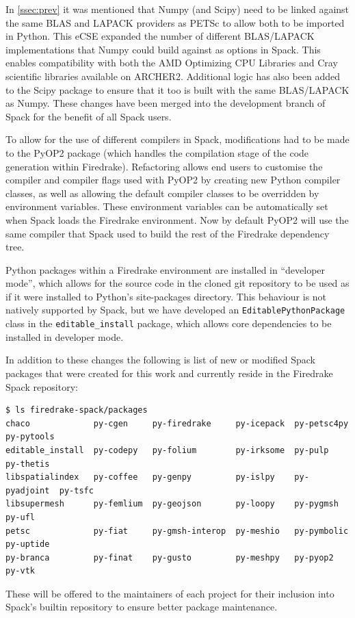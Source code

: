 \documentclass[a4paper,11pt]{article}
\begin{document}
In \cref{ssec:prev} it was mentioned that Numpy (and Scipy) need to be linked against the same BLAS and LAPACK providers as PETSc to allow both to be imported in Python.
This eCSE expanded the number of different BLAS/LAPACK implementations that Numpy could build against as options in Spack.
This enables compatibility with both the AMD Optimizing CPU Libraries and Cray scientific libraries available on ARCHER2.
Additional logic has also been added to the Scipy package to ensure that it too is built with the same BLAS/LAPACK as Numpy.
These changes have been merged into the development branch of Spack for the benefit of all Spack users.

To allow for the use of different compilers in Spack, modifications had to be made to the PyOP2 package (which handles the compilation stage of the code generation within Firedrake).
Refactoring allows end users to customise the compiler and compiler flags used with PyOP2 by creating new Python compiler classes, as well as allowing the default compiler classes to be overridden by environment variables.
These environment variables can be automatically set when Spack loads the Firedrake environment.
Now by default PyOP2 will use the same compiler that Spack used to build the rest of the Firedrake dependency tree.

Python packages within a Firedrake environment are installed in ``developer mode'', which allows for the source code in the cloned git repository to be used as if it were installed to Python's site-packages directory.
This behaviour is not natively supported by Spack, but we have developed an \verb`EditablePythonPackage` class in the \verb`editable_install` package, which allows core dependencies to be installed in developer mode.

In addition to these changes the following is list of new or modified Spack packages that were created for this work and currently reside in the Firedrake Spack repository:
\begin{lstlisting}
$ ls firedrake-spack/packages
chaco             py-cgen     py-firedrake     py-icepack  py-petsc4py   py-pytools
editable_install  py-codepy   py-folium        py-irksome  py-pulp       py-thetis
libspatialindex   py-coffee   py-genpy         py-islpy    py-pyadjoint  py-tsfc
libsupermesh      py-femlium  py-geojson       py-loopy    py-pygmsh     py-ufl
petsc             py-fiat     py-gmsh-interop  py-meshio   py-pymbolic   py-uptide
py-branca         py-finat    py-gusto         py-meshpy   py-pyop2      py-vtk
\end{lstlisting}
These will be offered to the maintainers of each project for their inclusion into Spack's builtin repository to ensure better package maintenance.
\end{document}
